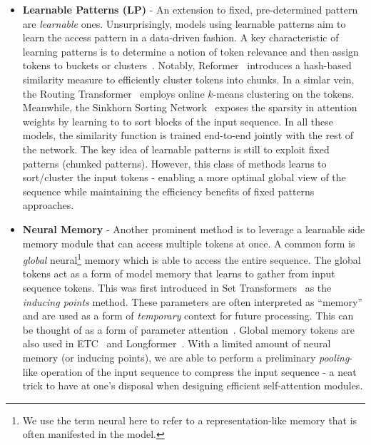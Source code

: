 \begin{itemize}
\item \textbf{Learnable Patterns (LP)} - An extension to fixed, pre-determined pattern are \emph{learnable} ones. Unsurprisingly, models using learnable patterns aim to learn the access pattern in a data-driven fashion. A key characteristic of learning patterns is to determine a notion of token relevance and then assign tokens to buckets or clusters~\citep{vyas2020fast, wang2020cluster}. Notably, Reformer~\citep{kitaev2020reformer} introduces a hash-based similarity measure to efficiently cluster tokens into chunks. In a simlar vein, the Routing Transformer~\citep{roy2020efficient} employs online $k$-means clustering on the tokens. Meanwhile, the Sinkhorn Sorting Network~\citep{tay2020sparse} exposes the sparsity in attention weights by learning to to sort blocks of the input sequence. In all these models, the similarity function is trained end-to-end jointly with the rest of the network. The key idea of learnable patterns is still to exploit fixed patterns (chunked patterns). However, this class of methods learns to sort/cluster the input tokens - enabling a more optimal global view of the sequence while maintaining the efficiency benefits of fixed patterns approaches.

\item \textbf{Neural Memory} - Another prominent method is to leverage a learnable side memory module that can access multiple tokens at once. A common form is \emph{global} neural\footnote{We use the term neural here to refer to a representation-like memory that is often manifested in the model.} memory which is able to access the entire sequence. The global tokens act as a form of model memory that learns to gather from input sequence tokens. This was first introduced in Set Transformers~\citep{lee2019set} as the \textit{inducing points} method. These parameters are often interpreted as ``memory'' and are used as a form of \textit{temporary} context for future processing. This can be thought of as a form of parameter attention~\citep{sukhbaatar2019augmenting}. Global memory tokens are also used in ETC~\citep{ainslie2020etc} and Longformer~\citep{beltagy2020longformer}. With a limited amount of neural memory (or inducing points), we are able to perform a preliminary \textit{pooling}-like operation of the input sequence to compress the input sequence - a neat trick to have at one's disposal when designing efficient self-attention modules.


\end{itemize}
